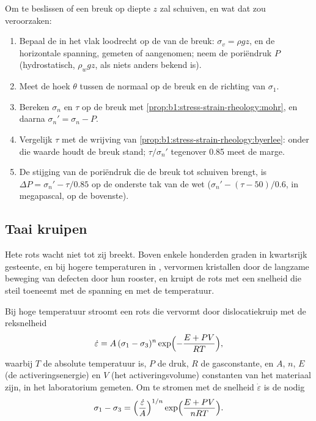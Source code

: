 \begin{method}\label{met:b1:stress-strain-rheology:slip-test}
Om te beslissen of een breuk op diepte $z$ zal schuiven, en wat dat zou veroorzaken:
\begin{enumerate}
  \item Bepaal de  in het vlak loodrecht op de  van de breuk: $\sigma_v = \rho g z$, en de horizontale spanning, gemeten of aangenomen; neem de poriëndruk $P$ (hydrostatisch, $\rho_w g z$, als niets anders bekend is).
  \item Meet de hoek $\theta$ tussen de normaal op de breuk en de richting van $\sigma_1$.
  \item Bereken $\sigma_n$ en $\tau$ op de breuk met \cref{prop:b1:stress-strain-rheology:mohr}, en daarna $\sigma_n' = \sigma_n - P$.
  \item Vergelijk $\tau$ met de wrijving van \cref{prop:b1:stress-strain-rheology:byerlee}: onder die waarde houdt de breuk stand; $\tau/\sigma_n'$ tegenover 0.85 meet de marge.
  \item De stijging van de poriëndruk die de breuk tot schuiven brengt, is $\Delta P = \sigma_n' - \tau/0.85$ op de onderste tak van de wet ($\sigma_n' - (\tau - 50)/0.6$, in megapascal, op de bovenste).
\end{enumerate}
\end{method}

\subsection*{Taai kruipen}

Hete rots wacht niet tot zij breekt. Boven enkele honderden graden in kwartsrijk gesteente, en bij hogere temperaturen in , vervormen kristallen door de langzame beweging van defecten door hun rooster, en kruipt de rots met een snelheid die steil toeneemt met de spanning en met de temperatuur.

\begin{proposition}\label{prop:b1:stress-strain-rheology:creep}
Bij hoge temperatuur stroomt een rots die vervormt door dislocatiekruip met de reksnelheid
\[
  \dot\varepsilon = A\,(\sigma_1 - \sigma_3)^n \exp\Bigl(-\frac{E + PV}{RT}\Bigr),
\]
waarbij $T$ de absolute temperatuur is, $P$ de druk, $R$ de gasconstante, en $A$, $n$, $E$ (de activeringsenergie) en $V$ (het activeringsvolume) constanten van het materiaal zijn, in het laboratorium gemeten. Om te stromen met de snelheid $\dot\varepsilon$ is de  nodig
\[
  \sigma_1 - \sigma_3 = \Bigl(\frac{\dot\varepsilon}{A}\Bigr)^{1/n}
  \exp\Bigl(\frac{E + PV}{nRT}\Bigr).
\]
\end{proposition}
\admitted

